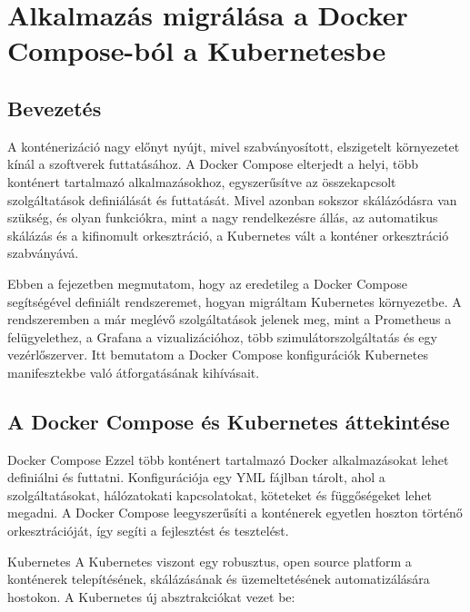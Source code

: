 \chapter{Alkalmazás migrálása a Docker Compose-ból a Kubernetesbe}

\section{Bevezetés}

A konténerizáció nagy előnyt nyújt, mivel szabványosított, elszigetelt környezetet kínál a szoftverek futtatásához. 
A Docker Compose elterjedt a helyi, több konténert tartalmazó alkalmazásokhoz, egyszerűsítve az összekapcsolt 
szolgáltatások definiálását és futtatását. Mivel azonban sokszor skálázódásra van szükség, és olyan funkciókra, 
mint a nagy rendelkezésre állás, az automatikus skálázás és a kifinomult orkesztráció, a Kubernetes vált a konténer 
orkesztráció szabványává.

Ebben a fejezetben megmutatom, hogy az eredetileg a Docker Compose segítségével definiált rendszeremet, 
hogyan migráltam Kubernetes környezetbe. A rendszeremben a már meglévő szolgáltatások jelenek meg, mint a 
Prometheus a felügyelethez, a Grafana a vizualizációhoz, több szimulátorszolgáltatás és egy vezérlőszerver. 
Itt bemutatom a Docker Compose konfigurációk Kubernetes manifesztekbe való átforgatásának kihívásait.

\section{A Docker Compose és Kubernetes áttekintése}

Docker Compose
Ezzel több konténert tartalmazó Docker alkalmazásokat lehet definiálni és futtatni. 
Konfigurációja egy YML fájlban tárolt, ahol a szolgáltatásokat, hálózatokati kapcsolatokat, köteteket és 
függőségeket lehet megadni. A Docker Compose leegyszerűsíti a konténerek egyetlen hoszton történő orkesztrációját, 
így segíti a fejlesztést és tesztelést.

Kubernetes
A Kubernetes viszont egy robusztus, open source platform a konténerek telepítésének, 
skálázásának és üzemeltetésének automatizálására hostokon. A Kubernetes új absztrakciókat vezet be:

